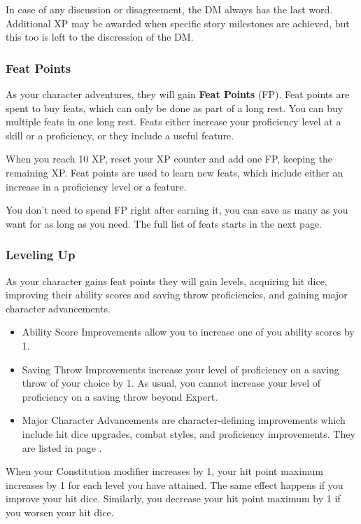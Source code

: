     In case of any discussion or disagreement, the DM always has the last word.
    Additional XP may be awarded when specific story milestones are achieved, but this too is left to the discression of the DM.

    \newpage

\subsubsection{Feat Points}
    As your character adventures, they will gain \textbf{Feat Points} (FP).
    Feat points are spent to buy feats, which can only be done as part of a long rest.
    You can buy multiple feats in one long rest.
    Feats either increase your proficiency level at a skill or a proficiency, or they include a useful feature.

    When you reach 10 XP, reset your XP counter and add one FP, keeping the remaining XP.
    Feat points are used to learn new feats, which include either an increase in a proficiency level or a feature.

    You don't need to spend FP right after earning it, you can save as many as you want for as long as you need.
    The full list of feats starts in the next page.

\subsubsection{Leveling Up}
    As your character gains feat points they will gain levels, acquiring hit dice, improving their ability scores and saving throw proficiencies, and gaining major character advancements.
    \begin{itemize}
        \item Ability Score Improvements allow you to increase one of you ability scores by 1.
        \item Saving Throw Improvements increase your level of proficiency on a saving throw of your choice by 1.
        As usual, you cannot increase your level of proficiency on a saving throw beyond Expert.
        \item Major Character Advancements are character-defining improvements which include hit dice upgrades, combat styles, and proficiency improvements.
        They are listed in page \pageref{sec::majorcharacterimprovements}.
    \end{itemize}

    When your Constitution modifier increases by 1, your hit point maximum increases by 1 for each level you have attained.
    The same effect happens if you improve your hit dice.
    Similarly, you decrease your hit point maximum by 1 if you worsen your hit dice.

    \newpage
